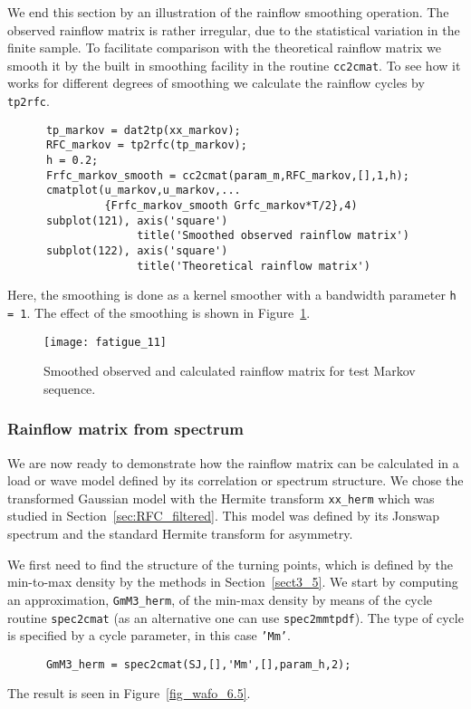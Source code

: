 We end this section by an illustration of the rainflow smoothing
operation. The observed rainflow matrix is rather irregular, due to
the statistical variation in the finite sample. 
To facilitate comparison with the theoretical
rainflow matrix we smooth it by the built in smoothing facility in the routine {\tt cc2cmat}. 
To see how it works for different
degrees of smoothing we calculate the rainflow cycles by {\tt tp2rfc}.
{\small\begin{verbatim}
      tp_markov = dat2tp(xx_markov);
      RFC_markov = tp2rfc(tp_markov);
      h = 0.2;
      Frfc_markov_smooth = cc2cmat(param_m,RFC_markov,[],1,h);
      cmatplot(u_markov,u_markov,...
               {Frfc_markov_smooth Grfc_markov*T/2},4)
      subplot(121), axis('square')
                    title('Smoothed observed rainflow matrix')
      subplot(122), axis('square')
                    title('Theoretical rainflow matrix')
\end{verbatim}}

Here, the smoothing is done as a kernel smoother with a bandwidth
parameter {\tt h = 1}. The effect of the smoothing is shown in
Figure~\ref{fig_wafo_6.7}.

\begin{figure}
\centering
\texttt{[image: fatigue\_11]}
\vspace{-3mm}
\caption[Smoothed observed and rainflow matrix for test
  Markov sequence]
{Smoothed observed and calculated rainflow matrix for test
  Markov sequence.}
\label{fig_wafo_6.7}
\end{figure}

\subsubsection{Rainflow matrix from spectrum}
\label{sec:rainflowfromspectrum}

We are now ready to demonstrate how the rainflow matrix can be calculated
in a load or wave model defined by its correlation or spectrum structure.
We chose the transformed Gaussian model with the Hermite transform
\verb+xx_herm+ which was studied in Section~\ref{sec:RFC_filtered}.
This model was defined by its {\sc Jonswap} spectrum and the standard
Hermite transform for asymmetry.

We first need to find the structure of the turning points,
which is defined by the min-to-max
density by the methods in Section~\ref{sect3_5}. We start by computing
an approximation, \verb+GmM3_herm+, of the min-max density by means of the
cycle routine {\tt spec2cmat} (as an alternative one can
use \verb+spec2mmtpdf+).
The type of cycle is specified
by a cycle parameter, in this case {\tt 'Mm'}.
{\small\begin{verbatim}
      GmM3_herm = spec2cmat(SJ,[],'Mm',[],param_h,2);
\end{verbatim}}
\noindent The result is seen in Figure~\ref{fig_wafo_6.5}.


